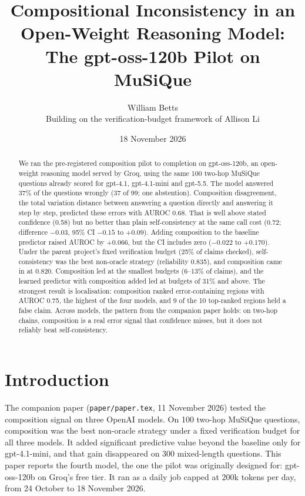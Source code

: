 \documentclass[11pt]{article}
\title{Compositional Inconsistency in an Open-Weight Reasoning Model:\\The gpt-oss-120b Pilot on MuSiQue}
\author{William Betts\\[2pt]\small Building on the verification-budget framework of Allison Li}
\date{18 November 2026}
\newcommand{\code}[1]{\texttt{#1}}
\begin{document}
\maketitle

\begin{abstract}
We ran the pre-registered composition pilot to completion on gpt-oss-120b, an open-weight
reasoning model served by Groq, using the same 100 two-hop MuSiQue questions already scored
for gpt-4.1, gpt-4.1-mini and gpt-5.5. The model answered 37\% of the questions wrongly
(37 of 99; one abstention). Composition disagreement, the total variation distance between
answering a question directly and answering it step by step, predicted these errors with
AUROC 0.68. That is well above stated confidence (0.58) but no better than plain
self-consistency at the same call cost (0.72; difference $-0.03$, 95\% CI $-0.15$ to
$+0.09$). Adding composition to the baseline predictor raised AUROC by $+0.066$, but the
CI includes zero ($-0.022$ to $+0.170$). Under the parent project's fixed verification
budget (25\% of claims checked), self-consistency was the best non-oracle strategy
(reliability 0.835), and composition came in at 0.820. Composition led at the smallest
budgets (6--13\% of claims), and the learned predictor with composition added led at
budgets of 31\% and above. The strongest result is localisation: composition ranked
error-containing regions with AUROC 0.75, the highest of the four models, and 9 of the 10
top-ranked regions held a false claim. Across models, the pattern from the companion paper
holds: on two-hop chains, composition is a real error signal that confidence misses, but
it does not reliably beat self-consistency.
\end{abstract}

\section{Introduction}

The companion paper (\code{paper/paper.tex}, 11 November 2026) tested the composition
signal on three OpenAI models. On 100 two-hop MuSiQue questions, composition was the best
non-oracle strategy under a fixed verification budget for all three models. It added
significant predictive value beyond the baseline only for gpt-4.1-mini, and that gain
disappeared on 300 mixed-length questions. This paper reports the fourth model, the one
the pilot was originally designed for: gpt-oss-120b on Groq's free tier. It ran as a daily
job capped at 200k tokens per day, from 24 October to 18 November 2026.
\end{document}
